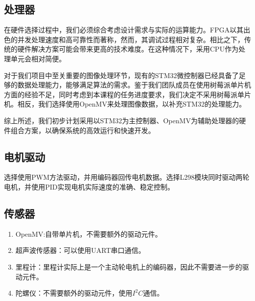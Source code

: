 \documentclass{report}
\begin{document}
\subsection{处理器}
在硬件选择过程中，我们必须综合考虑设计需求与实际的运算能力。FPGA以其出色的并发处理速度和高可靠性而著称，然而，其调试过程相对复杂。相比之下，传统的硬件解决方案可能会带来更高的技术难度。在这种情况下，采用CPU作为处理单元会相对简便。

对于我们项目中至关重要的图像处理环节，现有的STM32微控制器已经具备了足够的数据处理能力，能够满足算法的需求。鉴于我们团队成员在使用树莓派单片机方面的经验不足，同时考虑到本课程的任务进度要求，我们决定不采用树莓派单片机。相反，我们选择使用OpenMV来处理图像数据，以补充STM32的处理能力。

综上所述，我们初步计划采用以STM32为主控制器、OpenMV为辅助处理器的硬件组合方案，以确保系统的高效运行和快速开发。
\label{subsec:label}
\subsection{电机驱动}
\label{subsec:label}
选择使用PWM方法驱动，并用编码器回传电机数据。选择L298模块同时驱动两轮电机，并使用PID实现电机实际速度的准确、稳定控制。
\subsection{传感器}
\label{subsec:label}
\begin{enumerate}
\item OpenMV:自带单片机，不需要额外的驱动元件。
\item 超声波传感器：可以使用UART串口通信。
\item 里程计：里程计实际上是一个主动轮电机上的编码器，因此不需要进一步的驱动元件。
  \item 陀螺仪：不需要额外的驱动元件，使用$I^{2}C$通信。

  \end{enumerate}
  \newpage
\end{document}
